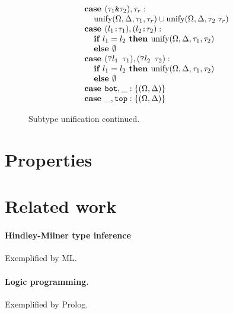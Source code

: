 \documentclass[acmsmall]{acmart}
\begin{document}
\begin{figure*}[h]
\[\begin{array}[t]{@{} l}
    \\

    \I \B{case } (\code{$\tau_1$\&$\tau_2$}), \tau_r : 
    \\
    \I\I \F{unify}(\Omega, \Delta, \tau_1, \tau_r) \cup \F{unify}(\Omega, \Delta, \tau_2\ \tau_r) 

    \\

    \I \B{case } (\code{$l_1$:$\tau_1$}), (\code{$l_2$:$\tau_2$}) :
    \\
    \I\I \B{if } l_1 = l_2 \B{ then } \F{unify}(\Omega, \Delta, \tau_1, \tau_2)
    \\
    \I\I \B{else } \emptyset 

    \\

    \I \B{case } (\code{?$l_1$ $\tau_1$}), (\code{?$l_2$ $\tau_2$}) :
    \\
    \I\I \B{if } l_1 = l_2 \B{ then } \F{unify}(\Omega, \Delta, \tau_1, \tau_2)
    \\
    \I\I \B{else } \emptyset 

    \\

    \I \B{case } \code{bot}, \_ : \{(\Omega, \Delta)\}

    \\

    \I \B{case } \_, \code{top} : \{(\Omega, \Delta)\}
\end{array}
\]

\caption{Subtype unification continued.}
\end{figure*}



\section{Properties}

\section{Related work}

\paragraph{Hindley-Milner type inference}
Exemplified by ML.

\paragraph{Logic programming.}
Exemplified by Prolog. 
\end{document}
